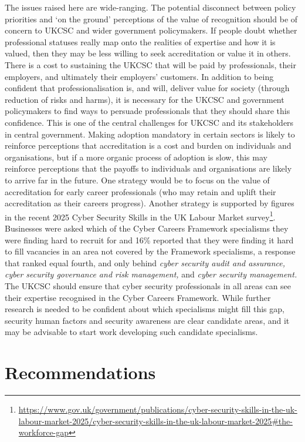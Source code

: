 \documentclass[
  a4paper,
]{book}
\begin{document}
The issues raised here are wide-ranging. The potential disconnect
between policy priorities and `on the ground' perceptions of the value
of recognition should be of concern to UKCSC and wider government
policymakers. If people doubt whether professional statuses really map
onto the realities of expertise and how it is valued, then they may be
less willing to seek accreditation or value it in others. There is a
cost to sustaining the UKCSC that will be paid by professionals, their
employers, and ultimately their employers' customers. In addition to
being confident that professionalisation is, and will, deliver value for
society (through reduction of risks and harms), it is necessary for the
UKCSC and government policymakers to find ways to persuade professionals
that they should share this confidence. This is one of the central
challenges for UKCSC and its stakeholders in central government. Making
adoption mandatory in certain sectors is likely to reinforce perceptions
that accreditation is a cost and burden on individuals and
organisations, but if a more organic process of adoption is slow, this
may reinforce perceptions that the payoffs to individuals and
organisations are likely to arrive far in the future. One strategy would
be to focus on the value of accreditation for early career professionals
(who may retain and uplift their accreditation as their careers
progress). Another strategy is supported by figures in the recent 2025
Cyber Security Skills in the UK Labour Market survey\footnote{\url{https://www.gov.uk/government/publications/cyber-security-skills-in-the-uk-labour-market-2025/cyber-security-skills-in-the-uk-labour-market-2025\#the-workforce-gap}}.
Businesses were asked which of the Cyber Careers Framework specialisms
they were finding hard to recruit for and 16\% reported that they were
finding it hard to fill vacancies in an area not covered by the
Framework specialisms, a response that ranked equal fourth, and only
behind \emph{cyber security audit and assurance, cyber security
governance and risk management,} and \emph{cyber security management.}
The UKCSC should ensure that cyber security professionals in all areas
can see their expertise recognised in the Cyber Careers Framework. While
further research is needed to be confident about which specialisms might
fill this gap, security human factors and security awareness are clear
candidate areas, and it may be advisable to start work developing such
candidate specialisms.

\section{Recommendations}\label{recommendations-1}
\end{document}
